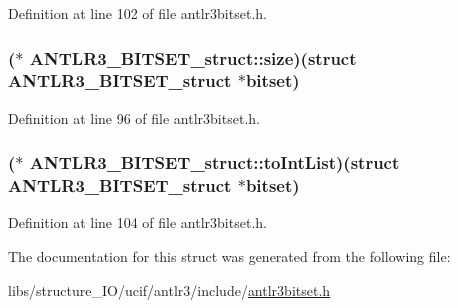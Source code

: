 Definition at line 102 of file antlr3bitset.\-h.

\hypertarget{struct_a_n_t_l_r3___b_i_t_s_e_t__struct_a3a0ba96ff9cff13ee102c33382175dd2}{
\subsubsection[{size}]{($\ast$ A\-N\-T\-L\-R3\-\_\-\-B\-I\-T\-S\-E\-T\-\_\-struct\-::size)(struct {\bf A\-N\-T\-L\-R3\-\_\-\-B\-I\-T\-S\-E\-T\-\_\-struct} $\ast$bitset)}}\label{struct_a_n_t_l_r3___b_i_t_s_e_t__struct_a3a0ba96ff9cff13ee102c33382175dd2}


Definition at line 96 of file antlr3bitset.\-h.

\hypertarget{struct_a_n_t_l_r3___b_i_t_s_e_t__struct_a0e2c28acd227ec3216dab2c7faa65760}{
\subsubsection[{to\-Int\-List}]{($\ast$ A\-N\-T\-L\-R3\-\_\-\-B\-I\-T\-S\-E\-T\-\_\-struct\-::to\-Int\-List)(struct {\bf A\-N\-T\-L\-R3\-\_\-\-B\-I\-T\-S\-E\-T\-\_\-struct} $\ast$bitset)}}\label{struct_a_n_t_l_r3___b_i_t_s_e_t__struct_a0e2c28acd227ec3216dab2c7faa65760}


Definition at line 104 of file antlr3bitset.\-h.



The documentation for this struct was generated from the following file\-:\begin{DoxyCompactItemize}
\item 
libs/structure\-\_\-\-I\-O/ucif/antlr3/include/\hyperlink{antlr3bitset_8h}{antlr3bitset.\-h}\end{DoxyCompactItemize}

